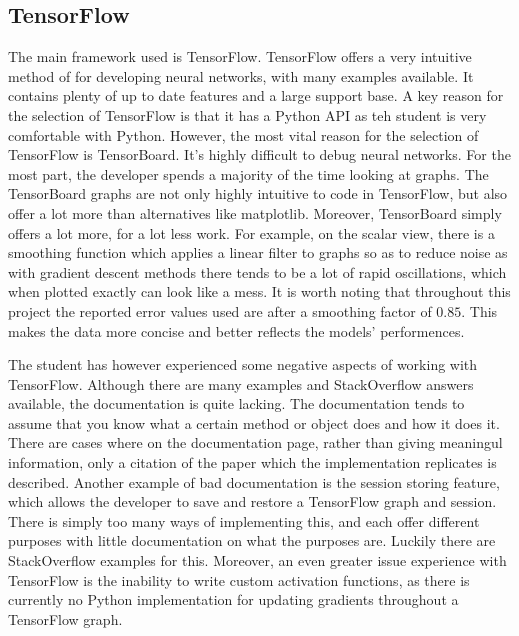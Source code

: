 \documentclass[12pt,a4paper,oneside,oldfontcommands]{memoir}
\begin{document}
\subsection{TensorFlow}
The main framework used is TensorFlow. TensorFlow offers a very intuitive method of for developing neural networks, with many examples available. It contains plenty of up to date features and a large support base. A key reason for the selection of TensorFlow is that it has a Python API as teh student is very comfortable with Python. However, the most vital reason for the selection of TensorFlow is TensorBoard. It's highly difficult to debug neural networks. For the most part, the developer spends a majority of the time looking at graphs. The TensorBoard graphs are not only highly intuitive to code in TensorFlow, but also offer a lot more than alternatives like matplotlib. Moreover, TensorBoard simply offers a lot more, for a lot less work. For example, on the scalar view, there is a smoothing function which applies a linear filter to graphs so as to reduce noise as with gradient descent methods there tends to be a lot of rapid oscillations, which when plotted exactly can look like a mess. It is worth noting that throughout this project the reported error values used are after a smoothing factor of \(0.85\). This makes the data more concise and better reflects the models' performences.

The student has however experienced some negative aspects of working with TensorFlow. Although there are many examples and StackOverflow answers available, the documentation is quite lacking. The documentation tends to assume that you know what a certain method or object does and how it does it. There are cases where on the documentation page, rather than giving meaningul information, only a citation of the paper which the implementation replicates is described. Another example of bad documentation is the session storing feature, which allows the developer to save and restore a TensorFlow graph and session. There is simply too many ways of implementing this, and each offer different purposes with little documentation on what the purposes are. Luckily there are StackOverflow examples for this. Moreover, an even greater issue experience with TensorFlow is the inability to write custom activation functions, as there is currently no Python implementation for updating gradients throughout a TensorFlow graph. 
\end{document}
